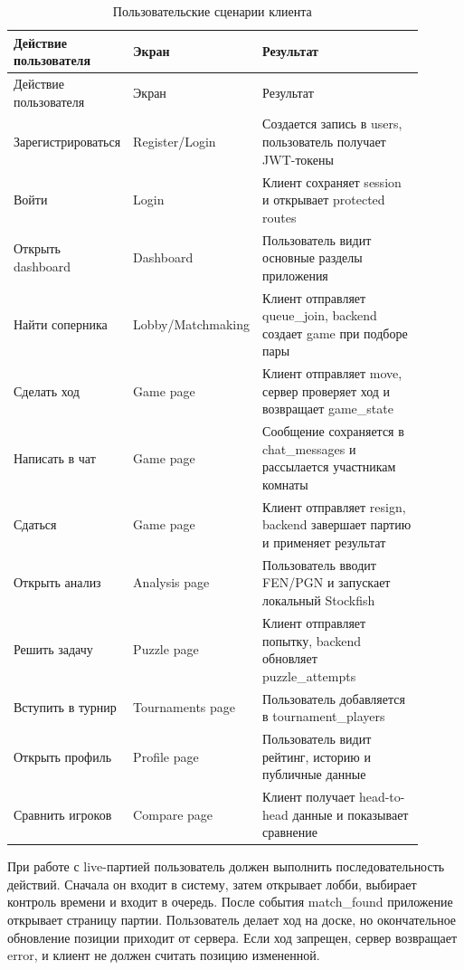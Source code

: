 \noindent\scriptsize
\setlength{\tabcolsep}{3pt}
\renewcommand{\arraystretch}{1.15}
\begin{longtable}{|>{\RaggedRight\arraybackslash}p{0.22\linewidth}|>{\RaggedRight\arraybackslash}p{0.26\linewidth}|>{\RaggedRight\arraybackslash}p{0.42\linewidth}|}
\caption{Пользовательские сценарии клиента}\label{tab:user-scenarios}\\
\hline
Действие пользователя & Экран & Результат\\ \hline
\endfirsthead
\hline
Действие пользователя & Экран & Результат\\ \hline
\endhead
Зарегистрироваться & Register/Login & Создается запись в users, пользователь получает JWT-токены\\ \hline
Войти & Login & Клиент сохраняет session и открывает protected routes\\ \hline
Открыть dashboard & Dashboard & Пользователь видит основные разделы приложения\\ \hline
Найти соперника & Lobby/Matchmaking & Клиент отправляет queue_join, backend создает game при подборе пары\\ \hline
Сделать ход & Game page & Клиент отправляет move, сервер проверяет ход и возвращает game_state\\ \hline
Написать в чат & Game page & Сообщение сохраняется в chat_messages и рассылается участникам комнаты\\ \hline
Сдаться & Game page & Клиент отправляет resign, backend завершает партию и применяет результат\\ \hline
Открыть анализ & Analysis page & Пользователь вводит FEN/PGN и запускает локальный Stockfish\\ \hline
Решить задачу & Puzzle page & Клиент отправляет попытку, backend обновляет puzzle_attempts\\ \hline
Вступить в турнир & Tournaments page & Пользователь добавляется в tournament_players\\ \hline
Открыть профиль & Profile page & Пользователь видит рейтинг, историю и публичные данные\\ \hline
Сравнить игроков & Compare page & Клиент получает head-to-head данные и показывает сравнение\\ \hline
\end{longtable}
\normalsize

При работе с live-партией пользователь должен выполнить последовательность действий. Сначала он входит в систему, затем открывает лобби, выбирает контроль времени и входит в очередь. После события match_found приложение открывает страницу партии. Пользователь делает ход на доске, но окончательное обновление позиции приходит от сервера. Если ход запрещен, сервер возвращает error, и клиент не должен считать позицию измененной.

